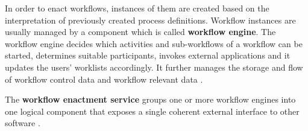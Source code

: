    In order to enact workflows, instances of them are created based on the interpretation of previously created process definitions. Workflow instances are usually managed by a component which is called \textbf{workflow engine}. The workflow engine decides which activities and sub-workflows of a workflow can be started, determines suitable participants, invokes external applications and it updates the users' worklists accordingly. It further manages the storage and flow of workflow control data and workflow relevant data \cite{Hollingsworth1995Wfmc}.

    The \textbf{workflow enactment service} groups one or more workflow engines into one logical component that exposes a single coherent external interface to other software \cite{Hollingsworth1995Wfmc}.
